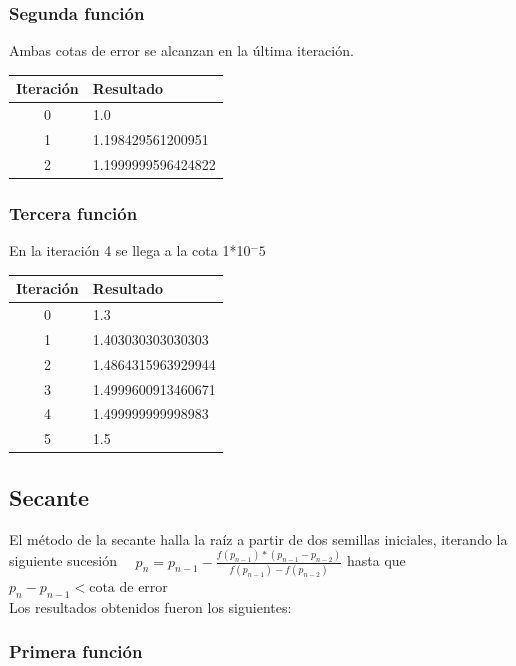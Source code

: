 \documentclass[titlepage,a4paper]{article}
\begin{document}
\subsubsection{Segunda función}\label{sec:NRM2}
Ambas cotas de error se alcanzan en la última iteración.
\begin{center}
    \begin{tabular}{| c | l |}
    \hline
     Iteración & Resultado \\ \hline
  0     &  1.0 \\
1     &  1.198429561200951 \\
2     &  1.1999999596424822 \\
    \hline
    \end{tabular}
\end{center}
\subsubsection{Tercera función}\label{sec:NRM3}
En la iteración 4 se llega a la cota 1*10$^-5$
\begin{center}
    \begin{tabular}{| c | l |}
    \hline
     Iteración & Resultado \\ \hline
  0     &  1.3 \\
1     &  1.403030303030303 \\
2     &  1.4864315963929944 \\
3     &  1.4999600913460671 \\
4     &  1.499999999998983 \\
5     &  1.5 \\
    \hline
    \end{tabular}
\end{center}

\subsection{Secante}\label{sec:biseccion}
El método de la secante halla la raíz a partir de dos semillas iniciales, iterando la siguiente sucesión
$\quad p_{n} =p_{n-1}-\frac{f (p_{n-1})*(p_{n-1}-p_{n-2})}{f(p_{n-1})-f(p_{n-2})}$ hasta que $p_{n}-p_{n-1} < \mbox{cota de error}$
\\

Los resultados obtenidos fueron los siguientes:

\subsubsection{Primera función}\label{sec:sec1}
\end{document}
